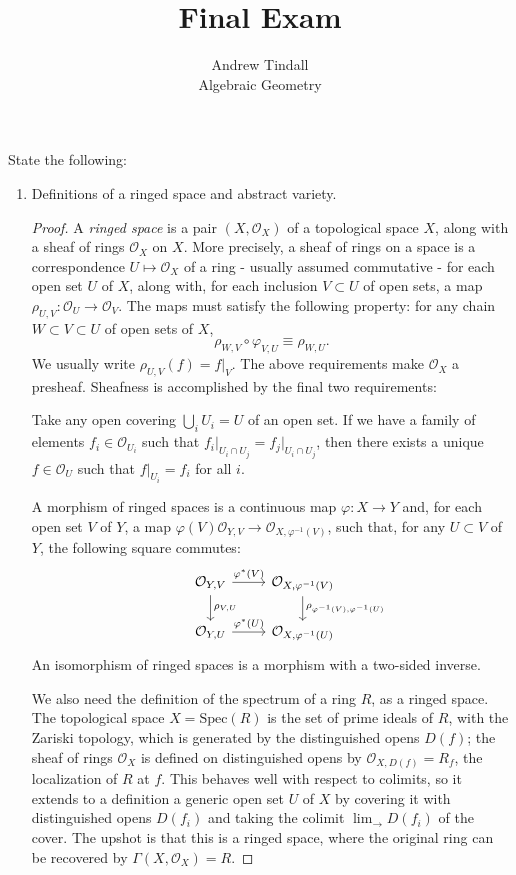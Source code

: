 \documentclass[12pt]{article}
\theoremstyle{definition}
\newenvironment{problem}[2][Problem]{\begin{trivlist}
\item[\hskip \labelsep {\bfseries #1}\hskip \labelsep {\bfseries #2.}]}{\end{trivlist}}
\begin{document}
 
 
\title{Final Exam}
\author{Andrew Tindall\\Algebraic Geometry}
\begin{problem}{1}
State the following:
\begin{enumerate}[label=(\alph*)]
	\item Definitions of a ringed space and abstract variety.
		\begin{proof}	
			A \textit{ringed space} is a pair $(X, \mathcal{O}_X)$ of a topological space $X$, along with a sheaf of rings $\mathcal{O}_X$ on $X$. More precisely, a sheaf of rings on a space is a correspondence $U \mapsto \mathcal{O}_X$ of a ring - usually assumed commutative - for each open set $U$ of $X$, along with, for each inclusion $V \subset U$ of open sets, a map $\rho_{U,V}: \mathcal{O}_U \to \mathcal{O}_V$. The maps must satisfy the following property: for any chain $W \subset V \subset U$ of open sets of $X$,
			\[ \rho_{W,V} \circ \varphi_{V,U} \equiv \rho_{W,U}.\]
			We usually write $\rho_{U,V}(f) = f\lvert_V$. The above requirements make $\mathcal{O}_X$ a presheaf. Sheafness is accomplished by the final two requirements:
			\par Take any open covering $\bigcup_i U_i = U$ of an open set. If we have a family of elements $f_i \in \mathcal O_{U_i}$ such that $f_i\lvert_{U_i \cap U_j} = f_j\lvert_{U_i \cap U_j}$, then there exists a unique $f \in \mathcal O_U$ such that $f\lvert_{U_i} = f_i$ for all $i$.
			\par A morphism of ringed spaces is a continuous map $ \varphi: X \to Y$ and, for each open set $V$ of $Y$, a map $\varphi(V)\mathcal{O}_{Y,V} \to \mathcal{O}_{X,\varphi^{-1}(V)}$, such that, for any $U \subset V$ of $Y$, the following square commutes:
			\[\begin{tikzcd}&\mathcal{O}_{Y,V} \arrow[r, "\varphi^*(V)"] \arrow[d, "\rho_{V,U}"] & \mathcal{O}_{X, \varphi^{-1}(V)} \arrow[d, " \rho_{\varphi^{-1}(V), \varphi^{-1}(U)}"]\\& \mathcal{O}_{Y,U} \arrow[r, "\varphi^*(U)"] & \mathcal{O}_{X, \varphi^{-1}(U)}\end{tikzcd}\]
			An isomorphism of ringed spaces is a morphism with a two-sided inverse.
			\par We also need the definition of the spectrum of a ring $R$, as a ringed space. The topological space $X = \text{Spec}(R)$ is the set of prime ideals of $R$, with the Zariski topology, which is generated by the distinguished opens $D(f)$; the sheaf of rings $\mathcal{O}_X$ is defined on distinguished opens by $\mathcal O_{X, D(f)} = R_f$, the localization of $R$ at $f$. This behaves well with respect to colimits, so it extends to a definition a generic open set $U$ of $X$ by covering it with distinguished opens $D(f_i)$ and taking the colimit $\lim_{\to} D(f_i)$ of the cover. The upshot is that this is a ringed space, where the original ring can be recovered by $\Gamma(X, \mathcal{O}_X) = R$.

\end{proof}
\end{enumerate}
\end{problem}
\end{document}
